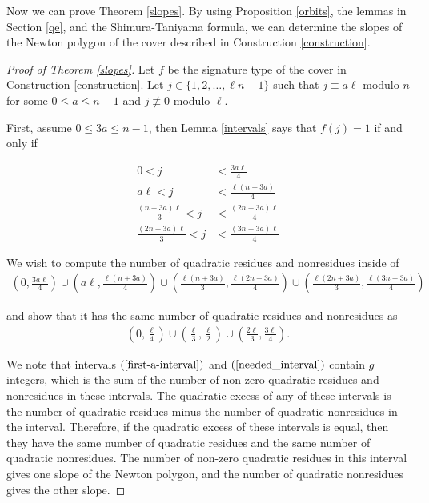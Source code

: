 \documentclass{article}
\theoremstyle{remark}
\theoremstyle{definition}
\begin{document}
Now we can prove Theorem \ref{slopes}. By using Proposition \ref{orbits}, the lemmas in Section \ref{qe}, and the Shimura-Taniyama formula, we can determine the slopes of the Newton polygon of the cover described in Construction \ref{construction}.

\begin{proof}[Proof of Theorem \ref{slopes}]
Let $f$ be the signature type of the cover in Construction \ref{construction}. Let $j \in \{1,2,\ldots,\ell n-1\}$ such that $j \equiv a\ell$ modulo $n$ for some $0 \leq a \leq n-1$ and $j \not \equiv 0$ modulo $\ell$.

First, assume $0 \leq 3a \leq n-1$, then Lemma \ref{intervals} says that $f(j) =1$ if and only if 

\begin{align}
0 < j& < \frac{3a\ell}{4} \label{first_i} \\
a\ell < j& < \frac{\ell(n+3a)}{4} \label{second_i} \\
 \frac{(n+3a)\ell}{3}  < j& < \frac{(2n+3a)\ell}{4} \label{third_i} \\
 \frac{(2n+3a)\ell}{3}  <  j& <  \frac{(3n+3a)\ell}{4} \label{fourth_i}
\end{align}

We wish to compute the number of quadratic residues and nonresidues inside of 
\begin{align} \left(0, \frac{3a\ell}{4}\right) \cup \left(a\ell, \frac{\ell(n+3a)}{4} \right) \cup \left(\frac{\ell(n+3a)}{3}, \frac{\ell(2n+3a)}{4} \right) \cup \left(\frac{\ell(2n+3a)}{3}, \frac{\ell(3n+3a)}{4} \right)\label{first-a-interval} \end{align}

and show that it has the same number of quadratic residues and nonresidues as 
\begin{align}\left(0, \frac{\ell}{4} \right) \cup \left(\frac{\ell}{3}, \frac{\ell}{2} \right) \cup \left(\frac{2\ell}{3}, \frac{3\ell}{4} \right). \label{needed_interval} \end{align}

We note that intervals $(\ref{first-a-interval})$ and $(\ref{needed_interval})$ contain $g$ integers, which is the sum of the number of non-zero quadratic residues and nonresidues in these intervals. The quadratic excess of any of these intervals is the number of quadratic residues minus the number of quadratic nonresidues in the interval. Therefore, if the quadratic excess of these intervals is equal, then they have the same number of quadratic residues and the same number of quadratic nonresidues. The number of non-zero quadratic residues in this interval gives one slope of the Newton polygon, and the number of quadratic nonresidues gives the other slope.


\end{proof}
\end{document}
